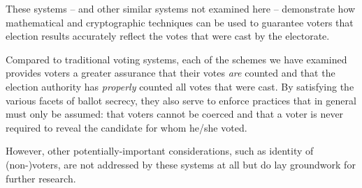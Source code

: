 \documentclass[10pt]{article}
\begin{document}
\begin{multicols}{2}
These systems -- and other similar systems not examined here -- demonstrate how mathematical and
cryptographic techniques can be used to guarantee voters that election results accurately reflect
the votes that were cast by the electorate.

Compared to traditional voting systems, each of the schemes we have examined provides voters a
greater assurance that their votes \emph{are} counted and that the election authority has
\emph{properly} counted all votes that were cast. By satisfying the various facets of ballot
secrecy, they also serve to enforce practices that in general must only be assumed: that voters
cannot be coerced and that a voter is never required to reveal the candidate for whom he/she voted.

However, other potentially-important considerations, such as identity of (non-)voters, are not
addressed by these systems at all but do lay groundwork for further research.




\end{multicols}
\end{document}
